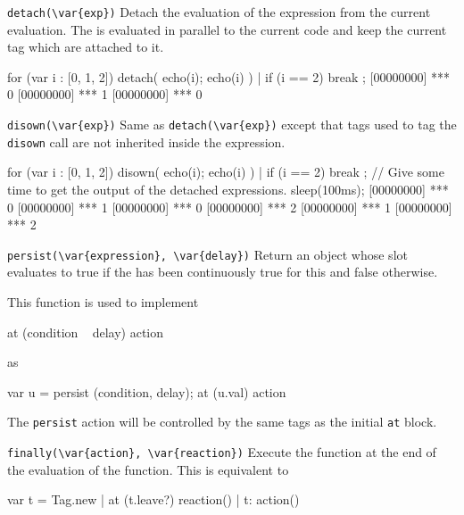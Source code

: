 \begin{urbiscriptapi}

\item \lstinline|detach(\var{exp})|
  Detach the evaluation of the expression  from the current
  evaluation.  The  is evaluated in parallel to the current code
  and keep the current tag which are attached to it.

\begin{urbiscript}
for (var i : [0, 1, 2])
{
  detach({
    echo(i);
    echo(i)
  }) |
  if (i == 2)
    break
};
[00000000] *** 0
[00000000] *** 1
[00000000] *** 0
\end{urbiscript}

\item \lstinline|disown(\var{exp})|%
  Same as \lstinline|detach(\var{exp})| except that tags used to tag
  the \lstinline|disown| call are not inherited inside the expression.

\begin{urbiscript}
for (var i : [0, 1, 2])
{
  disown({
    echo(i);
    echo(i)
  }) |
  if (i == 2)
    break
};
// Give some time to get the output of the detached expressions.
sleep(100ms);
[00000000] *** 0
[00000000] *** 1
[00000000] *** 0
[00000000] *** 2
[00000000] *** 1
[00000000] *** 2
\end{urbiscript}

\item \lstinline|persist(\var{expression}, \var{delay})| Return an
  object whose  slot evaluates to true if the
   has been continuously true for this  and
  false otherwise.

  This function is used to implement

\begin{urbiunchecked}
at (condition ~ delay)
  action
\end{urbiunchecked}

  \noindent
  as

\begin{urbiunchecked}
var u = persist (condition, delay);
at (u.val)
  action
\end{urbiunchecked}

  The \lstinline|persist| action will be controlled by the same tags
  as the initial \lstinline|at| block.


\item \lstinline|finally(\var{action}, \var{reaction})|
  Execute the  function at the end of the evaluation of
  the  function.  This is equivalent to

\begin{urbiunchecked}
{
  var t = Tag.new |
  at (t.leave?)
    reaction() |
  t: action()
}
\end{urbiunchecked}


\end{urbiscriptapi}



